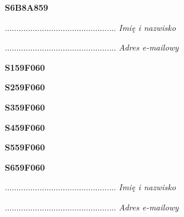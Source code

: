 \begin{turn}{90}\huge \textbf{S6B8A859}\end{turn}

\begin{turn}{90}\begin{minipage}{\linewidth} \vspace{20mm} ................................................  \textit{Imię i nazwisko}\end{minipage}\end{turn}

\begin{turn}{90}\begin{minipage}{\linewidth} \vspace{20mm} ................................................  \textit{Adres e-mailowy}\end{minipage}\end{turn}

\begin{turn}{90}\huge \textbf{S159F060}\end{turn}

\begin{turn}{90}\huge \textbf{S259F060}\end{turn}

\begin{turn}{90}\huge \textbf{S359F060}\end{turn}

\begin{turn}{90}\huge \textbf{S459F060}\end{turn}

\begin{turn}{90}\huge \textbf{S559F060}\end{turn}

\begin{turn}{90}\huge \textbf{S659F060}\end{turn}

\begin{turn}{90}\begin{minipage}{\linewidth} \vspace{20mm} ................................................  \textit{Imię i nazwisko}\end{minipage}\end{turn}

\begin{turn}{90}\begin{minipage}{\linewidth} \vspace{20mm} ................................................  \textit{Adres e-mailowy}\end{minipage}\end{turn}

